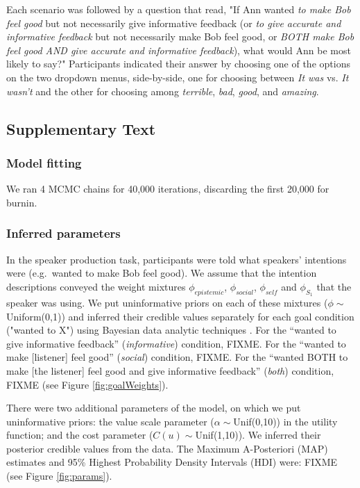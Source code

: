 \documentclass[12pt]{article}
\begin{document}
Each scenario was followed by a question that read, "If Ann wanted \emph{to make Bob feel good} but not necessarily give informative feedback (or \emph{to give accurate and informative feedback} but not necessarily make Bob feel good, or \emph{BOTH make Bob feel good AND give accurate and informative feedback}), what would Ann be most likely to say?" Participants indicated their answer by choosing one of the options on the two dropdown menus, side-by-side, one for choosing between \emph{It was} vs. \emph{It wasn't} and the other for choosing among \emph{terrible}, \emph{bad}, \emph{good}, and \emph{amazing}.

\subsection*{Supplementary Text}

\subsubsection*{Model fitting}

We ran 4 MCMC chains for 40,000 iterations, discarding the first 20,000 for burnin. 

\subsubsection*{Inferred parameters}

In the speaker production task, participants were told what speakers' intentions were 
(e.g.~wanted to make Bob feel good). 
We assume that the intention descriptions conveyed the weight mixtures $\phi_{epistemic}$, $\phi_{social}$, $\phi_{self}$ and $\phi_{S_1}$ that the speaker was using. 
We put uninformative priors on each of these mixtures ($\phi \sim$ Uniform(0,1)) 
and inferred their credible values separately for each goal condition ("wanted to X") 
using Bayesian data analytic techniques \cite{lee2014}. 
For the \enquote{wanted to give informative feedback} (\emph{informative}) condition, FIXME. 
For the \enquote{wanted to make [listener] feel good} (\emph{social}) condition, FIXME. 
For the \enquote{wanted BOTH to make [the listener] feel good and give informative feedback} (\emph{both}) condition, FIXME (see Figure \ref{fig:goalWeights}). 

There were two additional parameters of the model, on which we put uninformative priors: the value scale parameter ($\alpha \sim $Unif(0,10)) in the utility function; and the cost parameter ($C(u) \sim $Unif(1,10)). We inferred their posterior credible values from the data. The Maximum A-Posteriori (MAP) estimates and 95\% Highest Probability Density Intervals (HDI) were: FIXME (see Figure \ref{fig:params}).
\end{document}
